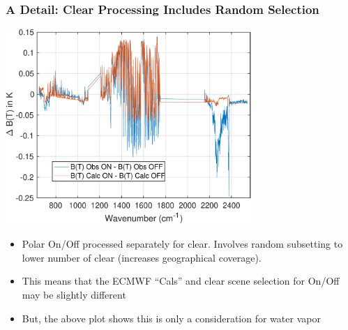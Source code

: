 \documentclass[10pt,t]{beamer} \usepackage[utf8]{inputenc}
\begin{document}
\begin{frame}
  \frametitle{A Detail: Clear Processing Includes Random Selection}
  \vspace{-0.125in} %
  \begin{center}
    \noindent\includegraphics[width=0.7\textwidth]{Figs/calcs_obs_diffs_sep_clear_done_with_data_and_subsetted.pdf}
  \end{center}
\vspace{-0.15in}
  \begin{footnotesize}
  \begin{itemize}
    \item Polar On/Off processed separately for clear.  Involves random subsetting to lower number of clear (increases geographical coverage).
    \item This means that the ECMWF ``Cals'' and clear scene selection for On/Off may be slightly different
    \item But, the above plot shows this is only a consideration for water vapor 
      \end{itemize}
\end{footnotesize}
    \end{frame}
\end{document}
